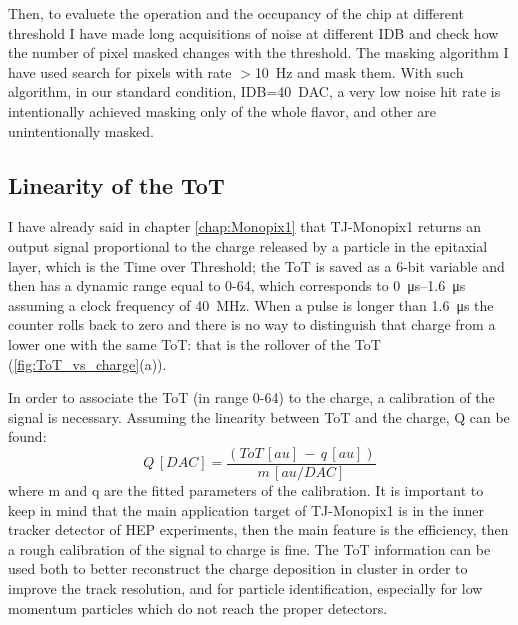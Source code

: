         Then, to evaluete the operation and the occupancy of the chip at different threshold I have made long acquisitions of noise at different IDB and check how the number of pixel masked changes with the threshold. The masking algorithm I have used search for pixels with rate $>$\SI{10}{Hz} and mask them. With such algorithm, in our standard condition, IDB=\SI{40}{DAC}, a very low noise hit rate is intentionally achieved masking only  of the whole flavor, and other  are unintentionally masked. 

    \subsection{Linearity of the ToT}    
        I have already said in chapter \ref{chap:Monopix1} that TJ-Monopix1 returns an output signal proportional to the charge released by a particle in the epitaxial layer, which is the Time over Threshold; the ToT is saved as a 6-bit variable and then has a dynamic range equal to 0-64, which corresponds to \SIrange{0}{1.6}{\us} assuming a clock frequency of \SI{40}{MHz}.
        When a pulse is longer than \SI{1.6}{\us} the counter rolls back to zero and there is no way to distinguish that charge from a lower one with the same ToT: that is the rollover of the ToT (\ref{fig:ToT_vs_charge}(a)).   

        In order to associate the ToT (in range 0-64) to the charge, a calibration of the signal is necessary. Assuming the linearity between ToT and the charge, Q can be found: 
        \begin{equation}
            Q\, [DAC] = \frac{(ToT\,[au]\, -\, q\,[au])}{m\, [au/DAC]} 
        \end{equation}
        where m and q are the fitted parameters of the calibration.
        It is important to keep in mind that the main application target of TJ-Monopix1 is in the inner tracker detector of HEP experiments, then the main feature is the efficiency, then a rough calibration of the signal to charge is fine. The ToT information can be used both to better reconstruct the charge deposition in cluster in order to improve the track resolution, and for particle identification, especially for low momentum particles which do not reach the proper detectors.
                        
